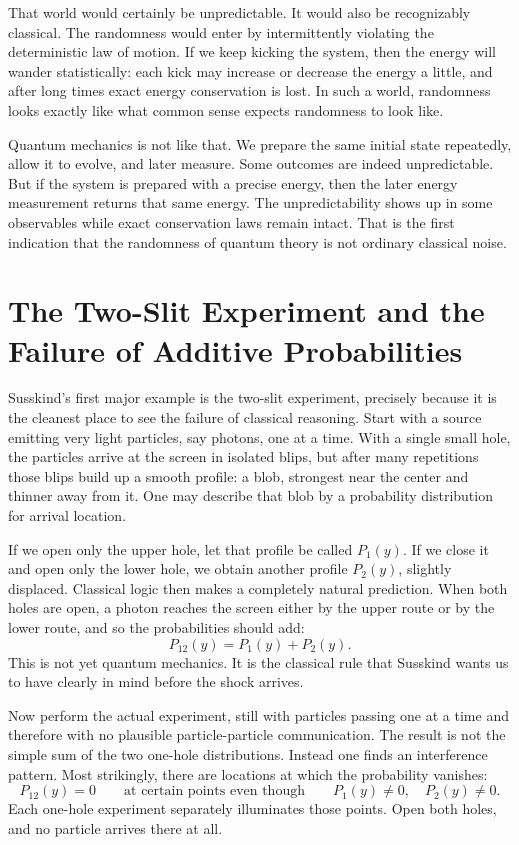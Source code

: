 That world would certainly be unpredictable. It would also be recognizably classical. The randomness would enter by intermittently violating the deterministic law of motion. If we keep kicking the system, then the energy will wander statistically: each kick may increase or decrease the energy a little, and after long times exact energy conservation is lost. In such a world, randomness looks exactly like what common sense expects randomness to look like.

Quantum mechanics is not like that. We prepare the same initial state repeatedly, allow it to evolve, and later measure. Some outcomes are indeed unpredictable. But if the system is prepared with a precise energy, then the later energy measurement returns that same energy. The unpredictability shows up in some observables while exact conservation laws remain intact. That is the first indication that the randomness of quantum theory is not ordinary classical noise.

\section{The Two-Slit Experiment and the Failure of Additive Probabilities}

Susskind's first major example is the two-slit experiment, precisely because it is the cleanest place to see the failure of classical reasoning. Start with a source emitting very light particles, say photons, one at a time. With a single small hole, the particles arrive at the screen in isolated blips, but after many repetitions those blips build up a smooth profile: a blob, strongest near the center and thinner away from it. One may describe that blob by a probability distribution for arrival location.

If we open only the upper hole, let that profile be called \(P_1(y)\). If we close it and open only the lower hole, we obtain another profile \(P_2(y)\), slightly displaced. Classical logic then makes a completely natural prediction. When both holes are open, a photon reaches the screen either by the upper route or by the lower route, and so the probabilities should add:
\begin{equation}
P_{12}(y)=P_1(y)+P_2(y).
\end{equation}
This is not yet quantum mechanics. It is the classical rule that Susskind wants us to have clearly in mind before the shock arrives.

Now perform the actual experiment, still with particles passing one at a time and therefore with no plausible particle-particle communication. The result is not the simple sum of the two one-hole distributions. Instead one finds an interference pattern. Most strikingly, there are locations at which the probability vanishes:
\begin{equation}
P_{12}(y)=0
\qquad \text{at certain points even though} \qquad
P_1(y)\neq 0,\quad P_2(y)\neq 0.
\end{equation}
Each one-hole experiment separately illuminates those points. Open both holes, and no particle arrives there at all.

